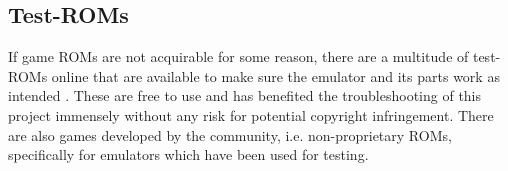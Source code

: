 
\subsection{Test-ROMs}

If game ROMs are not acquirable for some reason, there are a multitude of test-ROMs online that are available to make sure the emulator and its parts work as intended \cite{testROMs}. These are free to use and has benefited the troubleshooting of this project immensely without any risk for potential copyright infringement. There are also games developed by the community, i.e. non-proprietary ROMs, specifically for emulators which have been used for testing.

\newpage
